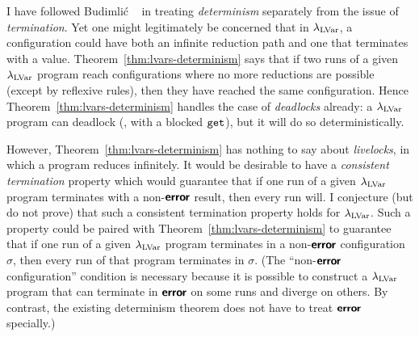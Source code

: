 I have followed Budimli\'c \etal~\cite{CnC} in treating
\emph{determinism} separately from the issue of \emph{termination}.
Yet one might legitimately be concerned that in $\lambda_{\textrm{LVar}}$, a
configuration could have both an infinite reduction path and one that
terminates with a value.  Theorem~\ref{thm:lvars-determinism} says
that if two runs of a given $\lambda_{\textrm{LVar}}$ program reach configurations
where no more reductions are possible (except by reflexive rules),
then they have reached the same configuration.  Hence
Theorem~\ref{thm:lvars-determinism} handles the case of
\emph{deadlocks} already: a $\lambda_{\textrm{LVar}}$ program can deadlock (\eg,
with a blocked $\mbox{\texttt{get}}$), but it will do so deterministically.

However, Theorem~\ref{thm:lvars-determinism} has nothing to say about
\emph{livelocks}, in which a program reduces infinitely.  It would be
desirable to have a {\em consistent termination} property which would
guarantee that if one run of a given $\lambda_{\textrm{LVar}}$ program terminates
with a non-$\textbf{\textsf{error}}$ result, then every run will.  I conjecture (but do
not prove) that such a consistent termination property holds for
$\lambda_{\textrm{LVar}}$.  Such a property could be paired with
Theorem~\ref{thm:lvars-determinism} to guarantee that if one run of a
given $\lambda_{\textrm{LVar}}$ program terminates in a non-$\textbf{\textsf{error}}$ configuration
$\sigma$, then every run of that program terminates in $\sigma$.  (The
``non-$\textbf{\textsf{error}}$ configuration'' condition is necessary because it is
possible to construct a $\lambda_{\textrm{LVar}}$ program that can terminate in
$\textbf{\textsf{error}}$ on some runs and diverge on others.  By contrast, the
existing determinism theorem does not have to treat $\textbf{\textsf{error}}$
specially.)
